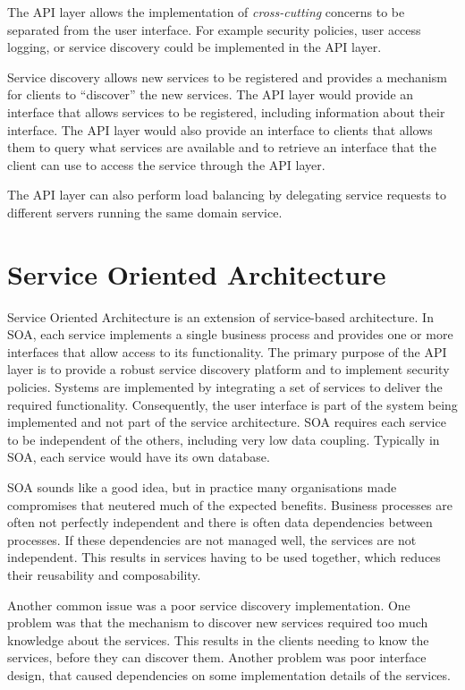 The API layer allows the implementation of \emph{cross-cutting} concerns to be separated from the user interface.
For example security policies, user access logging, or service discovery could be implemented in the API layer.

Service discovery allows new services to be registered and provides a mechanism for clients to ``discover'' the new services.
The API layer would provide an interface that allows services to be registered, including information about their interface.
The API layer would also provide an interface to clients that allows them to query what services are available
and to retrieve an interface that the client can use to access the service through the API layer.

The API layer can also perform load balancing by delegating service requests to different servers running the same domain service.


\section{Service Oriented Architecture}

Service Oriented Architecture  is an extension of service-based architecture.
In SOA, each service implements a single business process and provides one or more interfaces that allow access to its functionality.
The primary purpose of the API layer is to provide a robust service discovery platform and to implement security policies.
Systems are implemented by integrating a set of services to deliver the required functionality.
Consequently, the user interface is part of the system being implemented and not part of the service architecture.
SOA requires each service to be independent of the others, including very low data coupling.
Typically in SOA, each service would have its own database.

SOA sounds like a good idea, but in practice many organisations made compromises that neutered much of the expected benefits.
Business processes are often not perfectly independent and there is often data dependencies between processes.
If these dependencies are not managed well, the services are not independent.
This results in services having to be used together, which reduces their reusability and composability.

Another common issue was a poor service discovery implementation.
One problem was that the mechanism to discover new services required too much knowledge about the services.
This results in the clients needing to know the services, before they can discover them.
Another problem was poor interface design, that caused dependencies on some implementation details of the services.

